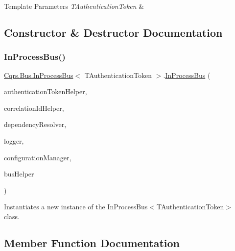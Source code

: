 \begin{DoxyTemplParams}{Template Parameters}
{\em T\+Authentication\+Token} & \\
\hline
\end{DoxyTemplParams}


\subsection{Constructor \& Destructor Documentation}
\mbox{\label{classCqrs_1_1Bus_1_1InProcessBus_a64bea583461562783d97cd98ff0dff91}} 
\subsubsection{\texorpdfstring{In\+Process\+Bus()}{InProcessBus()}}
{\footnotesize\ttfamily \hyperlink{classCqrs_1_1Bus_1_1InProcessBus}{Cqrs.\+Bus.\+In\+Process\+Bus}$<$ T\+Authentication\+Token $>$.\hyperlink{classCqrs_1_1Bus_1_1InProcessBus}{In\+Process\+Bus} (\begin{DoxyParamCaption}\item[{\hyperlink{interfaceCqrs_1_1Authentication_1_1IAuthenticationTokenHelper}{I\+Authentication\+Token\+Helper}$<$ T\+Authentication\+Token $>$}]{authentication\+Token\+Helper,  }\item[{I\+Correlation\+Id\+Helper}]{correlation\+Id\+Helper,  }\item[{\hyperlink{interfaceCqrs_1_1Configuration_1_1IDependencyResolver}{I\+Dependency\+Resolver}}]{dependency\+Resolver,  }\item[{I\+Logger}]{logger,  }\item[{\hyperlink{interfaceCqrs_1_1Configuration_1_1IConfigurationManager}{I\+Configuration\+Manager}}]{configuration\+Manager,  }\item[{\hyperlink{interfaceCqrs_1_1Bus_1_1IBusHelper}{I\+Bus\+Helper}}]{bus\+Helper }\end{DoxyParamCaption})}



Instantiates a new instance of the In\+Process\+Bus$<$\+T\+Authentication\+Token$>$ class. 



\subsection{Member Function Documentation}
\mbox{\label{classCqrs_1_1Bus_1_1InProcessBus_a603950d39c407d5b9661dc0937fa67cc}} 

